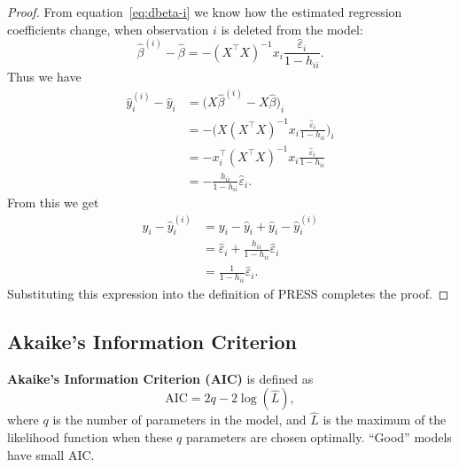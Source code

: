 \documentclass[
  a4paper,
]{article}
\theoremstyle{definition}
\theoremstyle{definition}
\theoremstyle{definition}
\theoremstyle{definition}
\theoremstyle{remark}
\begin{document}
\begin{proof}
From equation~\eqref{eq:dbeta-i} we know how the estimated regression
coefficients change, when observation \(i\) is deleted from the model:
\begin{equation*}
   \hat\beta^{(i)} - \hat\beta
   = - (X^\top X)^{-1} x_i \frac{\hat\varepsilon_i}{1 - h_{ii}}.
\end{equation*}
Thus we have
\begin{align*}
   \hat y^{(i)}_i - \hat y_i
   &= \bigl( X \hat\beta^{(i)} - X \hat\beta \bigr)_i \\
   &= - \bigl( X (X^\top X)^{-1} x_i \frac{\hat\varepsilon_i}{1 - h_{ii}} \bigr)_i \\
   &= - x_i^\top (X^\top X)^{-1} x_i \frac{\hat\varepsilon_i}{1 - h_{ii}} \\
   &= - \frac{h_{ii}}{1 - h_{ii}} \hat\varepsilon_i.
\end{align*}
From this we get
\begin{align*}
   y_i - \hat y^{(i)}_i
   &= y_i - \hat y_i + \hat y_i - \hat y^{(i)}_i \\
   &= \hat\varepsilon_i + \frac{h_{ii}}{1 - h_{ii}} \hat\varepsilon_i \\
   &= \frac{1}{1 - h_{ii}} \hat\varepsilon_i.
\end{align*}
Substituting this expression into the definition of PRESS
completes the proof.
\end{proof}

\subsection{Akaike's Information Criterion}\label{AIC}

\textbf{Akaike's Information Criterion (AIC)} is defined as
\begin{equation*}
    \mathrm{AIC}
    = 2q - 2 \log(\hat L),
\end{equation*}
where \(q\) is the number of parameters in the model, and \(\hat L\)
is the maximum of the likelihood function when these \(q\) parameters
are chosen optimally. ``Good'' models have small AIC.
\end{document}
